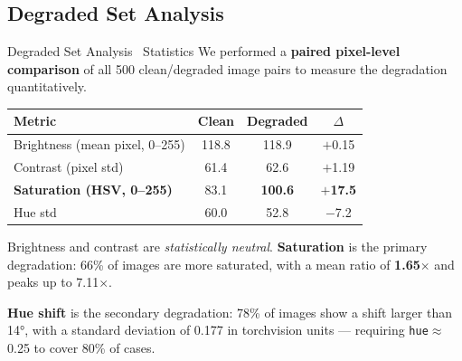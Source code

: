 \subsection{Degraded Set Analysis}
\begin{frame}{Degraded Set Analysis \textendash\ Statistics}
  We performed a \textbf{paired pixel-level comparison} of all 500 clean/degraded image pairs
  to measure the degradation quantitatively.
  \vspace{0.5\baselineskip}
  \begin{center}
    \begin{tabular}{lccc}
      \toprule
      Metric & Clean & Degraded & $\Delta$ \\
      \midrule
      Brightness (mean pixel, 0--255) & 118.8 & 118.9 & $+$0.15 \\
      Contrast (pixel std) & 61.4 & 62.6 & $+$1.19 \\
      \textbf{Saturation (HSV, 0--255)} & 83.1 & \textbf{100.6} & \textbf{$+$17.5} \\
      Hue std & 60.0 & 52.8 & $-$7.2 \\
      \bottomrule
    \end{tabular}
  \end{center}
  \vspace{0.5\baselineskip}
  Brightness and contrast are \textit{statistically neutral}. \textbf{Saturation} is the
  primary degradation: 66\% of images are more saturated, with a mean ratio of
  \textbf{1.65$\times$} and peaks up to 7.11$\times$.

  \textbf{Hue shift} is the secondary degradation: 78\% of images show a shift larger than
  14°, with a standard deviation of 0.177 in torchvision units --- requiring
  \texttt{hue}$\approx$0.25 to cover 80\% of cases.
\end{frame}


